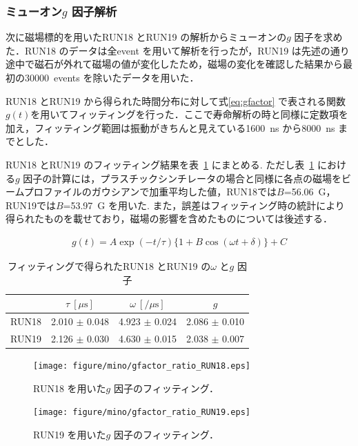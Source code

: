 \subsubsection{ミューオン$g$ 因子解析}

次に磁場標的を用いたRUN18 とRUN19 の解析からミューオンの$g$ 因子を求めた．RUN18 のデータは全event を用いて解析を行ったが，RUN19 は先述の通り途中で磁石が外れて磁場の値が変化したため，磁場の変化を確認した結果から最初の30000~events を除いたデータを用いた．

RUN18 とRUN19 から得られた時間分布に対して式\eqref{eq:gfactor} で表される関数$g(t)$を用いてフィッティングを行った．ここで寿命解析の時と同様に定数項を加え，フィッティング範囲は振動がきちんと見えている1600~ns から8000~ns までとした．

RUN18 とRUN19 のフィッティング結果を表~\ref{tab:gfactor_result} にまとめる.
ただし表~\ref{tab:gfactor_result} における$g$ 因子の計算には，プラスチックシンチレータの場合と同様に各点の磁場をビームプロファイルのガウシアンで加重平均した値，RUN18では$B$=56.06~G，RUN19では$B$=53.97~G を用いた.
また，誤差はフィッティング時の統計により得られたものを載せており，磁場の影響を含めたものについては後述する．

\begin{gather}
g(t) = A\exp(-t / \tau)\{1+B\cos(\omega t+\delta)\}+C\label{eq:gfactor}
\end{gather}
\begin{table}[H]
\caption{フィッティングで得られたRUN18 とRUN19 の$\omega$ と$g$ 因子}
\centering
\begin{tabular}{cccc}\toprule
{} & $\tau~[\mu \mathrm{s}]$ & $\omega~[/\mu \mathrm{s}]$ & $g$ \\ \midrule
RUN18 & 2.010 $\pm$ 0.048 & 4.923 $\pm$ 0.024 & 2.086 $\pm$ 0.010  \\
RUN19 & 2.126 $\pm$ 0.030 & 4.630 $\pm$ 0.015 & 2.038 $\pm$ 0.007 \\ \bottomrule
\end{tabular}
\label{tab:gfactor_result}
\end{table}

\begin{figure}[H]
\begin{minipage}{0.5\hsize}
\texttt{[image: figure/mino/gfactor\_ratio\_RUN18.eps]}
\caption{RUN18 を用いた$g$ 因子のフィッティング．}
\end{minipage}
\begin{minipage}{0.5\hsize}
\texttt{[image: figure/mino/gfactor\_ratio\_RUN19.eps]}
\caption{RUN19 を用いた$g$ 因子のフィッティング．}
\end{minipage}
\end{figure}

